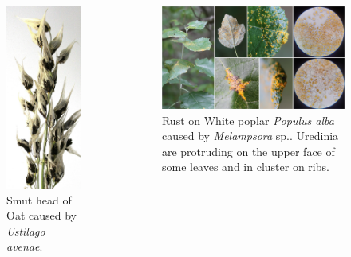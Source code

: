 \documentclass[10pt,dvipsnames,ignorenonframetext,aspectratio=169]{beamer}
\begin{document}
\begin{frame}{}
\protect\hypertarget{section-5}{}
\begin{columns}[T, onlytextwidth]

\begin{figure}
\includegraphics[width=0.45\linewidth]{../images/ustilago_avenae} \caption{Smut head of Oat caused by \textit{Ustilago avenae}.}\label{fig:avenae-smut}
\end{figure}


\begin{figure}
\includegraphics[width=0.95\linewidth]{../images/FdhD0Z3XoAIf1OB} \caption{Rust on White poplar \textit{Populus alba} caused by \textit{Melampsora} sp.. Uredinia are protruding on the upper face of some leaves and in cluster on ribs.}\label{fig:poplar-rust}
\end{figure}

\end{columns}
\end{frame}
\end{document}

